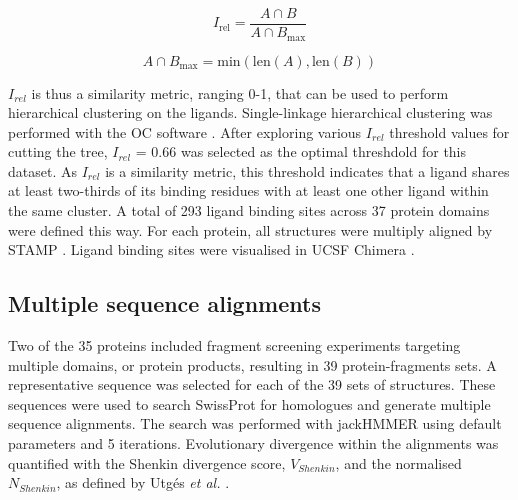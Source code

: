 \begin{equation}
    I_{\text{rel}} = \frac{A \cap B}{A \cap B_{\text{max}}}
\label{eq:relative_intersection} %
\end{equation}

\vspace{-35pt} %

\begin{equation}
    A \cap B_{\text{max}} = \text{min}(\text{len}(A), \text{len}(B))
\label{eq:max_intersection}
\end{equation}
\vspace{-21pt} %

$I_{rel}$ is thus a similarity metric, ranging 0-1, that can be used to perform hierarchical clustering on the ligands. Single-linkage hierarchical clustering was performed with the OC software \cite{BARTON_1993_OC}. After exploring various $I_{rel}$ threshold values for cutting the tree, $I_{rel}$ = 0.66 was selected as the optimal threshdold for this dataset. As $I_{rel}$ is a similarity metric, this threshold indicates that a ligand shares at least two-thirds of its binding residues with at least one other ligand within the same cluster. A total of 293 ligand binding sites across 37 protein domains were defined this way. For each protein, all structures were multiply aligned by STAMP \cite{RUSSELL_1992_STAMP}. Ligand binding sites were visualised in UCSF Chimera \cite{PETTERSEN_2004_CHIMERA}.

\subsection{Multiple sequence alignments}

Two of the 35 proteins included fragment screening experiments targeting multiple domains, or protein products, resulting in 39 protein-fragments sets. A representative sequence was selected for each of the 39 sets of structures. These sequences were used to search SwissProt \cite{BOUTET_2016_UNIPROT} for homologues and generate multiple sequence alignments. The search was performed with jackHMMER \cite{EDDY_1995_HMMER} using default parameters and 5 iterations. Evolutionary divergence within the alignments was quantified with the Shenkin divergence score, $V_{Shenkin}$, \cite{SHENKIN_1991_SCORE} and the normalised $N_{Shenkin}$, as defined by Utgés \textit{et al.} \cite{UTGES_2021_ANKS}.

